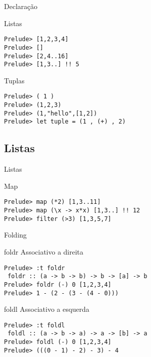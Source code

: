 \documentclass{beamer}
\begin{document}
	\begin{frame}{}
	\end{frame}
	
		\begin{frame}[fragile]{Declaração}
			\begin{block}{Listas}
		\begin{lstlisting}
Prelude> [1,2,3,4]
Prelude> []
Prelude> [2,4..16]
Prelude> [1,3..] !! 5
		 \end{lstlisting}
		\end{block}
		
		\begin{block}{Tuplas}
		\begin{lstlisting}
Prelude> ( 1 )
Prelude> (1,2,3)
Prelude> (1,"hello",[1,2])
Prelude> let tuple = (1 , (+) , 2)
		 \end{lstlisting}
		\end{block}
		
		\end{frame}
	
	\subsection{Listas}
	
	\begin{frame}[fragile]{Listas}
		\begin{block}{Map}
			\begin{lstlisting}
Prelude> map (*2) [1,3..11]
Prelude> map (\x -> x*x) [1,3..] !! 12
Prelude> filter (>3) [1,3,5,7]
			\end{lstlisting}
		\end{block}	 
	\end{frame}
	
	\begin{frame}[fragile]{Folding}
	 \begin{block}{foldr}
	  Associativo a direita
	  \begin{lstlisting}
Prelude> :t foldr
 foldr :: (a -> b -> b) -> b -> [a] -> b
Prelude> foldr (-) 0 [1,2,3,4]
Prelude> 1 - (2 - (3 - (4 - 0)))
	  \end{lstlisting}
	 \end{block}
	 
	 \begin{block}{foldl}
	  Associativo a esquerda
	  \begin{lstlisting}
Prelude> :t foldl
 foldl :: (a -> b -> a) -> a -> [b] -> a
Prelude> foldl (-) 0 [1,2,3,4]
Prelude> (((0 - 1) - 2) - 3) - 4
	  \end{lstlisting}
	 \end{block}
	\end{frame}
	
\end{document}

